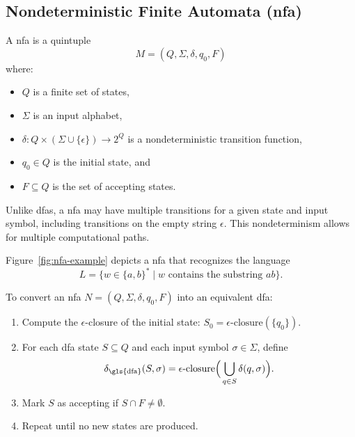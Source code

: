 
\subsection{Nondeterministic Finite Automata (\gls{nfa})}
\label{subsec:nfa}

\begin{definition}
A \gls{nfa} is a quintuple 
\[
M = (Q, \Sigma, \delta, q_0, F)
\]
where:
\begin{itemize}
    \item \( Q \) is a finite set of states,
    \item \( \Sigma \) is an input alphabet,
    \item \( \delta: Q \times (\Sigma \cup \{\epsilon\}) \rightarrow 2^Q \) is a nondeterministic transition function,
    \item \( q_0 \in Q \) is the initial state, and
    \item \( F \subseteq Q \) is the set of accepting states.
\end{itemize}
\end{definition}

\begin{remark}
Unlike \glspl{dfa}, a \gls{nfa} may have multiple transitions for a given state and input symbol, including transitions on the empty string \(\epsilon\). This nondeterminism allows for multiple computational paths.
\end{remark}

\begin{example}
Figure~\ref{fig:nfa-example} depicts a \gls{nfa} that recognizes the language 
\[
L = \{ w \in \{a,b\}^* \mid w \text{ contains the substring } ab \}.
\]
\end{example}

\begin{algorithm}
\label{alg:subset}
To convert an \gls{nfa} \( N = (Q, \Sigma, \delta, q_0, F) \) into an equivalent \gls{dfa}:
\begin{enumerate}
    \item Compute the \(\epsilon\)-closure of the initial state: \( S_0 = \epsilon\text{-closure}(\{q_0\}) \).
    \item For each \gls{dfa} state \( S \subseteq Q \) and each input symbol \(\sigma \in \Sigma\), define 
    \[
    \delta_{\text{\gls{dfa}}}(S, \sigma) = \epsilon\text{-closure}\Big(\bigcup_{q \in S} \delta(q, \sigma)\Big).
    \]
    \item Mark \( S \) as accepting if \( S \cap F \neq \emptyset \).
    \item Repeat until no new states are produced.
\end{enumerate}
\end{algorithm}

